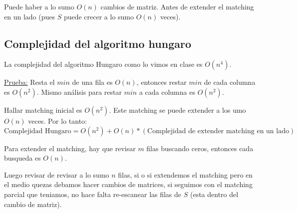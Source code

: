 \documentclass[12pt,a4paper]{article}
\begin{document}
\begin{itemize}
\begin{itemize}
\begin{figure}[h!]
            \end{figure}
    \end{itemize}
    \begin{corolario} Puede haber a lo sumo $O(n)$ cambios de matriz. Antes de extender 
        el matching en un lado (pues $S$ puede crecer a lo sumo $O(n)$ veces).
    \end{corolario}
\end{itemize}

\subsection{Complejidad del algoritmo hungaro}
\begin{teorema} La complejidad del algoritmo Hungaro como lo vimos en clase es $O(n^4)$.
\end{teorema}

\underline{Prueba:} Resta el $min$ de una fila es $O(n)$, entonces restar $min$ de 
cada columna es $O(n^2)$. Mismo análisis para restar $min$ a cada columna es $O(n^{2})$.
\medskip

Hallar matching inicial es $O(n^2)$. Este matching se puede extender a los umo 
$O(n)$ veces. Por lo tanto:
$$\text{Complejidad Hungaro} = O(n^2) + O(n)*(\text{Complejidad de extender matching en un lado})$$

Para extender el matching, hay que revisar $m$ filas buscando ceros, entonces cada 
busqueda es $O(n)$.
\medskip

Luego revisar de revisar a lo sumo $n$ filas, si o si extendemos el matching pero 
en el medio quezas debamos hacer cambios de matrices, si seguimos con el matching 
parcial que teniamos, no hace falta re-escanear las filas de $S$ (esta dentro del 
cambio de matriz).
\medskip
\end{document}
